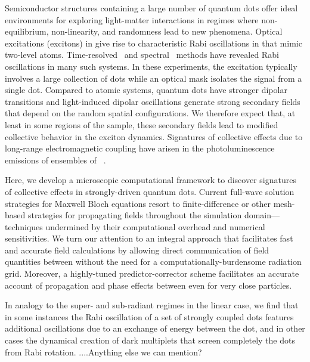 Semiconductor structures containing a large number of quantum dots offer ideal environments for exploring light-matter interactions in regimes where non-equilibrium, non-linearity, and randomness lead to new phenomena.
Optical excitations (excitons) in give rise to characteristic Rabi oscillations in \qds{} that mimic two-level atoms.
Time-resolved~\cite{stievater,shih} and spectral~\cite{kamada} methods have revealed Rabi oscillations in many such systems.
In these experiments, the excitation typically involves a large collection of dots while an optical mask isolates the signal from a single dot.
Compared to atomic systems, quantum dots have stronger dipolar transitions and light-induced dipolar oscillations generate strong secondary fields that  depend on the random spatial configurations.
We therefore expect that, at least in some regions of the sample, these secondary fields lead to modified collective behavior in the exciton dynamics.
Signatures of collective effects due to long-range electromagnetic coupling have arisen in the photoluminescence emissions of ensembles of \qds{}~\cite{forchel}.

Here, we develop a microscopic computational framework to discover signatures of collective effects in strongly-driven quantum dots.
Current full-wave solution strategies for Maxwell Bloch equations resort to finite-difference or other mesh-based strategies\cite{Vanneste2001, Fratalocchi2008} for propagating fields throughout the simulation domain---techniques undermined by their computational overhead and numerical sensitivities\cite{Baczewski2013}.
We turn our attention to an integral approach that facilitates fast and accurate field calculations by allowing direct communication of field quantities between \qds{} without the need for a computationally-burdensome radiation grid.
Moreover, a highly-tuned predictor-corrector scheme facilitates an accurate account of propagation and phase effects between \qds{} even for very close particles. 

In analogy to the super- and sub-radiant regimes in the linear case, we find that in some instances the Rabi oscillation of a set of strongly coupled dots features additional oscillations due to an exchange of energy between the dot, and in other cases the dynamical creation of dark multiplets that screen completely the dots from Rabi rotation. ....Anything else we can mention?
